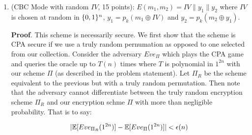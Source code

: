 \documentclass{article}
\begin{document}
\begin{enumerate}
\begin{enumerate}[,label=\alph*.]
\begin{mdbmarginx}{1ex}{0pt}{1ex}{0pt}
\begin{enumerate}[noitemsep,topsep=\mdcompacttopsep]
\item{}Suppose $c^* = E(m_1) = E(0^{n-1}|| 1|| 0^{n}) = IV^* || p_k(2) || p_k(2)$. Note that in this 
case, $Eve$ will always output $1$. Therefore, $Eve$ succeed with probability $\frac{1}{2}$.%
\end{enumerate}%

\noindent{}Then combining the above, the success probability is $\frac{1}{2} + \frac{1}{4} = \frac{3}{4}$ which
is non-negligibly above $\frac{1}{2}$. Therefore, the scheme is not CPA secure.%
\end{mdbmarginx}%

\item{}
(CBC Mode with random $IV$, 15 points): $E(m_1,m_2)=IV\|y_1\|y_2$ where $IV$ is chosen at random in $\{0,1\}^n$, $y_1 = p_k(m_1 \oplus IV)$ and $y_2 = p_k(m_2 \oplus y_1)$.%

\begin{mdbmarginx}{1ex}{0pt}{1ex}{0pt}%
\noindent{}\textbf{Proof}.  This scheme is necessarily secure. We first show that the scheme is CPA secure if we use a truly
random pernumation as opposed to one selected from our collection. Consider the adversary
$Eve_{\Pi}$ which plays the CPA game and queries the oracle up to $T(n)$ times where $T$ is polynomial
in $1^{2n}$ with our scheme $\Pi$ (as described in the problem statement).
Let $\Pi_R$ be the scheme equivalent to the previous but with a truly random permutation. Then note
that the adversary cannot differentiate between the truly random encryption scheme $\Pi_R$ and 
our encryption schme $\Pi$ with more than negligible probability. That is to say:%
\end{mdbmarginx}%
\noindent\noindent\[%
|\E[Eve_{\Pi_R}(1^{2n})] - \E[Eve_{\Pi}(1^{2n})] | < \epsilon(n)
\]%


\end{enumerate}
\end{enumerate}
\end{document}
